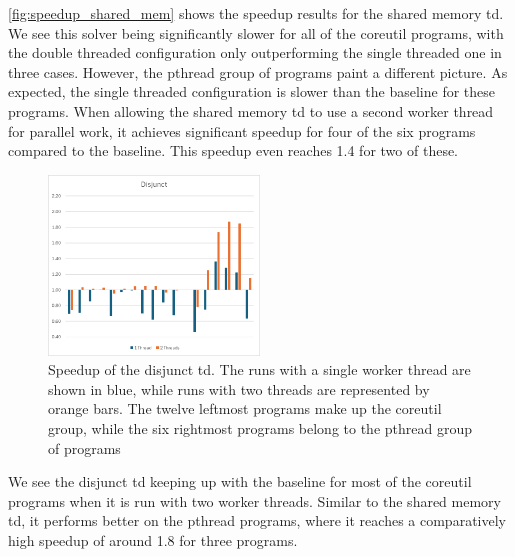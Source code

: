   \autoref{fig:speedup_shared_mem} shows the speedup results for the shared memory \ac{td}. We see this solver being significantly slower for all of the coreutil programs, with the double threaded configuration only outperforming the single threaded one in three cases. However, the pthread group of programs paint a different picture. As expected, the single threaded configuration is slower than the baseline for these programs. When allowing the shared memory \ac{td} to use a second worker thread for parallel work, it achieves significant speedup for four of the six programs compared to the baseline. This speedup even reaches 1.4 for two of these.

  \begin{figure}
    \includegraphics[width=0.5\textwidth]{../resources/Disjunct_draft.png}
    \caption[Speedup of the disjunct \ac{td}]{Speedup of the disjunct \ac{td}. The runs with a single worker thread are shown in blue, while runs with two threads are represented by orange bars. The twelve leftmost programs make up the coreutil group, while the six rightmost programs belong to the pthread group of programs}
    \label{fig:speedup_disjunct}
  \end{figure}

  We see the disjunct \ac{td} keeping up with the baseline for most of the coreutil programs when it is run with two worker threads. Similar to the shared memory \ac{td}, it performs better on the pthread programs, where it reaches a comparatively high speedup of around 1.8 for three programs.

